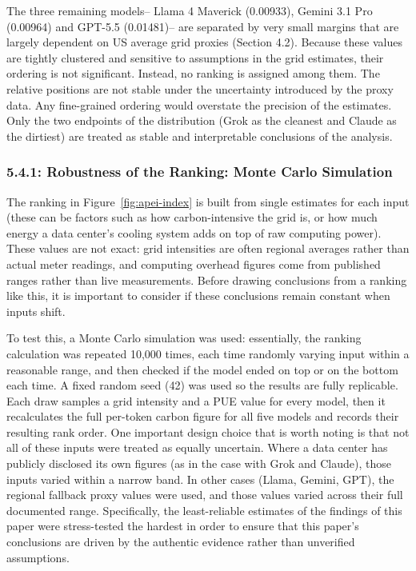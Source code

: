 \documentclass[11pt]{article}
\begin{document}
The three remaining models-- Llama 4 Maverick (0.00933), Gemini 3.1 Pro (0.00964) and GPT-5.5 (0.01481)-- are separated by very small margins that are largely dependent on US average grid proxies (Section 4.2). Because these values are tightly clustered and sensitive to assumptions in the grid estimates, their ordering is not significant. Instead, no ranking is assigned among them. The relative positions are not stable under the uncertainty introduced by the proxy data. Any fine-grained ordering would overstate the precision of the estimates. Only the two endpoints of the distribution (Grok as the cleanest and Claude as the dirtiest) are treated as stable and interpretable conclusions of the analysis.

\subsubsection*{5.4.1: Robustness of the Ranking: Monte Carlo Simulation}

The ranking in Figure~\ref{fig:apei-index} is built from single estimates for each input (these can be factors such as how carbon-intensive the grid is, or how much energy a data center's cooling system adds on top of raw computing power). These values are not exact: grid intensities are often regional averages rather than actual meter readings, and computing overhead figures come from published ranges rather than live measurements. Before drawing conclusions from a ranking like this, it is important to consider if these conclusions remain constant when inputs shift.

To test this, a Monte Carlo simulation was used: essentially, the ranking calculation was repeated 10,000 times, each time randomly varying input within a reasonable range, and then checked if the model ended on top or on the bottom each time. A fixed random seed (42) was used so the results are fully replicable. Each draw samples a grid intensity and a PUE value for every model, then it recalculates the full per-token carbon figure for all five models and records their resulting rank order. One important design choice that is worth noting is that not all of these inputs were treated as equally uncertain. Where a data center has publicly disclosed its own figures (as in the case with Grok and Claude), those inputs varied within a narrow band. In other cases (Llama, Gemini, GPT), the regional fallback proxy values were used, and those values varied across their full documented range. Specifically, the least-reliable estimates of the findings of this paper were stress-tested the hardest in order to ensure that this paper's conclusions are driven by the authentic evidence rather than unverified assumptions.
\end{document}
